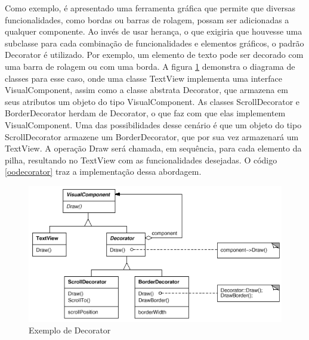 Como exemplo, é apresentado uma ferramenta  
gráfica que permite que diversas funcionalidades, 
como bordas ou barras de rolagem, possam ser adicionadas 
a qualquer componente. Ao invés de usar herança, 
o que exigiria que houvesse uma subclasse para cada 
combinação de funcionalidades e elementos gráficos, 
o padrão Decorator é utilizado. Por exemplo, um 
elemento de texto pode ser decorado com uma barra 
de rolagem ou com uma borda. A figura \ref{decorator_exemplo} 
demonstra o diagrama de classes para esse caso, 
onde uma classe TextView implementa uma interface 
VisualComponent, assim como a classe abstrata Decorator, 
que armazena em seus atributos um objeto do tipo 
VisualComponent. As classes ScrollDecorator e 
BorderDecorator herdam de Decorator, o que faz com que 
elas implementem VisualComponent. Uma das 
possibilidades desse cenário é que um objeto do tipo 
ScrollDecorator armazene um BorderDecorator, que 
por sua vez armazenará um TextView. A operação 
Draw será chamada, em sequência, para cada 
elemento da pilha, resultando no TextView 
com as funcionalidades desejadas. O código 
\ref{oodecorator} traz a implementação dessa 
abordagem.

\begin{figure}[htb]
	\caption{\label{decorator_exemplo}Exemplo de Decorator}
	\begin{center}
	    \includegraphics[scale=0.4]{5_padroes-contexto-funcional/5.2_estruturais/5.2.4_decorator/decorator_exemplo.png}
	\end{center}
\end{figure}

